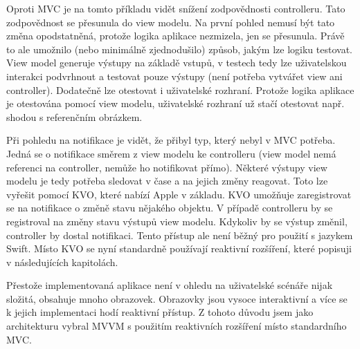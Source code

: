 Oproti MVC je na tomto příkladu vidět snížení zodpovědnosti controlleru. Tato zodpovědnost se přesunula do view modelu.
Na první pohled nemusí být tato změna opodstatněná, protože logika aplikace nezmizela, jen se přesunula.
Právě to ale umožnilo (nebo minimálně zjednodušilo) způsob, jakým lze logiku testovat.
View model generuje výstupy na základě vstupů, v testech tedy lze uživatelskou interakci podvrhnout a testovat pouze výstupy (není potřeba vytvářet view ani controller).
Dodatečně lze otestovat i uživatelské rozhraní.
Protože logika aplikace je otestována pomocí view modelu, uživatelské rozhraní už stačí otestovat např. shodou s referenčním obrázkem.

Při pohledu na notifikace je vidět, že přibyl typ, který nebyl v MVC potřeba.
Jedná se o notifikace směrem z view modelu ke controlleru (view model nemá referenci na controller, nemůže ho notifikovat přímo).
Některé výstupy view modelu je tedy potřeba sledovat v čase a na jejich změny reagovat.
Toto lze vyřešit pomocí KVO, které nabízí Apple v základu.
KVO umožňuje zaregistrovat se na notifikace o změně stavu nějakého objektu.
V případě controlleru by se registroval na změny stavu výstupů view modelu.
Kdykoliv by se výstup změnil, controller by dostal notifikaci.
Tento přístup ale není běžný pro použití s jazykem Swift.
Místo KVO se nyní standardně používají reaktivní rozšíření, které popisuji v následujících kapitolách.

Přestože implementovaná aplikace není v ohledu na uživatelské scénáře nijak složitá, obsahuje mnoho obrazovek.
Obrazovky jsou vysoce interaktivní a více se k jejich implementaci hodí reaktivní přístup.
Z tohoto důvodu jsem jako architekturu vybral MVVM s použitím reaktivních rozšíření místo standardního MVC.
